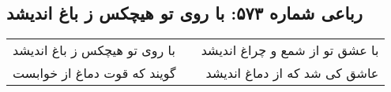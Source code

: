 \begin{center}
\section*{رباعی شماره ۵۷۳: با روی تو هیچکس ز باغ اندیشد}
\label{sec:0573}
\begin{longtable}{l p{0.5cm} r}
با روی تو هیچکس ز باغ اندیشد
&&
با عشق تو از شمع و چراغ اندیشد
\\
گویند که قوت دماغ از خوابست
&&
عاشق کی شد که از دماغ اندیشد
\\
\end{longtable}
\end{center}
